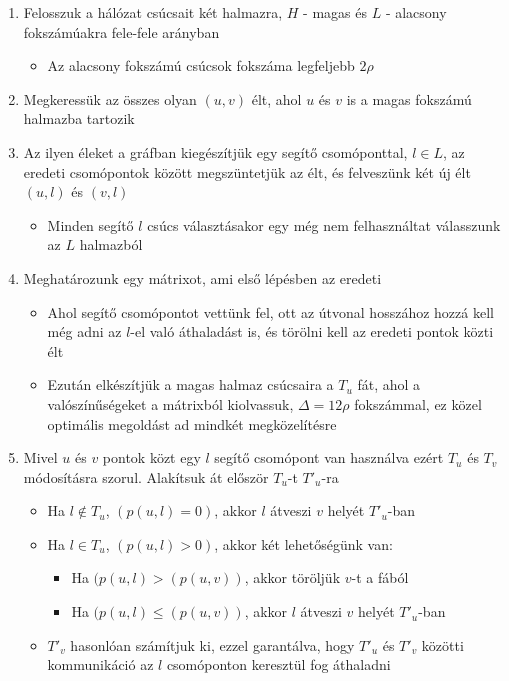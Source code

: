 \documentclass[12pt]{report}
\begin{document}
\begin{enumerate}
	\item Felosszuk a hálózat csúcsait két halmazra, \(H\) - magas és \(L\) - alacsony fokszámúakra fele-fele arányban
	\begin{itemize}
		\item Az alacsony fokszámú csúcsok fokszáma legfeljebb \(2\rho\)
	\end{itemize}
	\item Megkeressük az összes olyan \((u, v)\) élt, ahol \(u\) és \(v\) is a magas fokszámú halmazba tartozik
	\item Az ilyen éleket a gráfban kiegészítjük egy segítő csomóponttal, \(l \in L\), az eredeti csomópontok között megszüntetjük az élt, és felveszünk két új élt \((u, l)\) és \((v, l)\)
	\begin{itemize}
		\item Minden segítő \(l\) csúcs választásakor egy még nem felhasználtat válasszunk az \(L\) halmazból
	\end{itemize}
	\item Meghatározunk egy mátrixot, ami első lépésben az eredeti
	\begin{itemize}
		\item Ahol segítő csomópontot vettünk fel, ott az útvonal hosszához hozzá kell még adni az \(l\)-el való áthaladást is, és törölni kell az eredeti pontok közti élt
		\item Ezután elkészítjük a magas halmaz csúcsaira a \(T_u\) fát, ahol a valószínűségeket a mátrixból kiolvassuk, \(\Delta = 12\rho\) fokszámmal, ez közel optimális megoldást ad mindkét megközelítésre
	\end{itemize}
	\item Mivel \(u\) és \(v\) pontok közt egy \(l\) segítő csomópont van használva ezért \(T_u\) és \(T_v\) módosításra szorul. Alakítsuk át először \(T_u\)-t \(T'_u\)-ra
	\begin{itemize}
		\item Ha \(l \notin T_u\), \((p(u, l) = 0)\), akkor \(l\) átveszi \(v\) helyét \(T'_u\)-ban
		\item Ha \(l \in T_u\), \((p(u, l) > 0)\), akkor két lehetőségünk van:
		\begin{itemize}
			\item Ha \((p(u, l) > (p(u, v))\), akkor töröljük \(v\)-t a fából
			\item Ha \((p(u, l) \le (p(u, v))\), akkor \(l\) átveszi \(v\) helyét \(T'_u\)-ban
		\end{itemize}
		\item \(T'_v\) hasonlóan számítjuk ki, ezzel garantálva, hogy \(T'_u\) és \(T'_v\) közötti kommunikáció az \(l\) csomóponton keresztül fog áthaladni

\end{itemize}
\end{enumerate}
\end{document}

